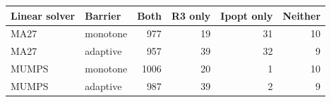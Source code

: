 \begin{tabular}{@{}llrrrr@{}}
\toprule
Linear solver & Barrier & Both & R3 only & Ipopt only & Neither\\
\midrule
MA27 & monotone & 977 & 19 & 31 & 10\\
MA27 & adaptive & 957 & 39 & 32 & 9\\
MUMPS & monotone & 1006 & 20 & 1 & 10\\
MUMPS & adaptive & 987 & 39 & 2 & 9\\
\bottomrule
\end{tabular}

